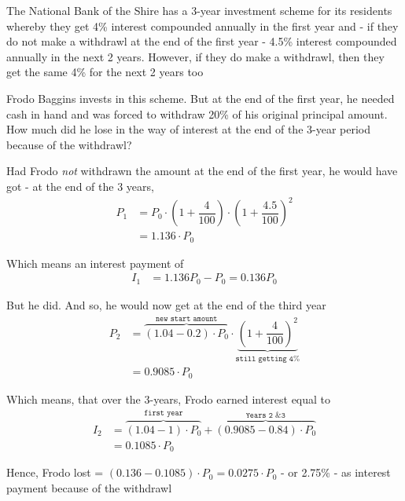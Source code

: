 

\question[5]  The National Bank of the Shire has a 3-year investment scheme
for its residents whereby they get 4\% interest compounded annually in the 
first year and - if they do not make a withdrawl at the end of the first year - 
4.5\% interest compounded annually in the next 2 years. However, if they do make
a withdrawl, then they get the same 4\% for the next 2 years too

Frodo Baggins invests in this scheme. But at the end of the first year, 
he needed cash in hand and was forced to withdraw 20\% of his original principal amount.
How much did he lose in the way of interest at the end of the 3-year period because
of the withdrawl?


\ifprintanswers
\fi 

\begin{solution}[\fullpage]
	Had Frodo \textit{not} withdrawn the amount at the end of the first year, he would have
	 got - at the end of the 3 years,
	\begin{align}
		P_1 &= P_0\cdot\left(1+\dfrac{4}{100}\right)\cdot\left(1+\dfrac{4.5}{100}\right)^{2} \\
		    &= 1.136\cdot P_0
	\end{align}
	
	Which means an interest payment of
	\begin{align}
		I_1 &= 1.136 P_0 - P_0 = 0.136 P_0
	\end{align}
	
	But he did. And so, he would now get at the end of the third year
	\begin{align}
		P_2 &= \overbrace{(1.04-0.2)\cdot P_0}^{\texttt{new start amount}}\cdot
		\underbrace{\left( 1 + \dfrac{4}{100}\right)^2}_{\texttt{still getting 4\%}} \\
		&= 0.9085\cdot P_0
	\end{align}
	
	Which means, that over the 3-years, Frodo earned interest equal to
	\begin{align}
		I_2 &= \overbrace{(1.04 - 1)\cdot P_0}^{\texttt{first year}} + 
		       \overbrace{(0.9085 - 0.84)\cdot P_0}^{\texttt{Years 2 \& 3}} \\
		    &= 	0.1085\cdot P_0
	\end{align}
	
	Hence, Frodo lost = $(0.136 - 0.1085)\cdot P_0 = 0.0275\cdot P_0$ - or 2.75\% - as interest 
	payment because of the withdrawl
	
\end{solution}
\ifprintanswers\begin{codex}\end{codex}\fi
